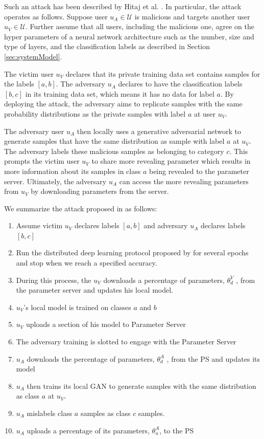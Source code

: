 \documentclass[letterpaper]{article}
\begin{document}
\begin{flushleft}
{Such an attack has been described by Hitaj et al. \cite{hitaj2017deep}. In particular, the attack operates as follows. 
Suppose user $u_A\in\mathcal{U}$ is malicious and targets another user $u_V\in\mathcal{U}$. Further assume that all users, including
the malicious one, agree on the hyper parameters of a neural network architecture such as the number, size and type of layers,  and the
classification labels as described in Section \ref{sec:systemModel}.

The victim user $u_V$ declares that its private training data set contains samples for the  labels $[a,b]$. The adversary
$u_A$ declares to have the classification labels $[b,c]$ in its training data set, which means it has no data for label $a$. By
deploying the attack, the adversary aims to replicate samples with the same probability distributions as the private samples with label
$a$ at user $u_V$.

The adversary user $u_A$ then locally uses a generative adversarial network to generate samples that have the same distribution as
sample with label $a$ at $u_V$. The adversary labels these malicious samples as belonging to category $c$. This prompts the victim 
user $u_V$ to share more revealing parameter which results in more information about its samples in class $a$ being revealed to the parameter server. Ultimately, the adversary $u_A$ can access the more revealing
parameters from $u_V$ by downloading parameters from the server. 

We summarize the attack proposed in \cite{hitaj2017deep} as follows:
\begin {enumerate}
\item Assume victim $u_V$ declares labels $[a,b]$ and adversary $u_A$ declares labels $[b,c]$
\item Run the distributed deep learning protocol proposed by \cite{shokri2015privacy} for several epochs and stop when we reach a
specified accuracy.
\item During this process, the $u_V$ downloads a percentage  of parameters, $\theta^V_d$ ,  from the
parameter
server and updates his local model.
\item $u_V$'s local model is trained on classes $a$ and $b$
\item $u_V$ uploads a section of his model to Parameter Server
\item The adversary training is slotted to engage with the Parameter Server
\item $u_A$ downloads the percentage of parameters, $\theta^A_d$ , from the PS and updates its model
\item $u_A$ then trains its local GAN to generate samples with the same distribution as class $a$ at $u_V$.
\item $u_A$  mislabels class $a$ samples as class $c$ samples.
\item $u_A$ uploads a percentage of its parameters, $\theta^A_u$, to the PS
\end {enumerate}

}
\end{flushleft}
\end{document}
